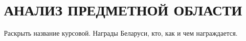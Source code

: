\section[Анализ предметной области]{АНАЛИЗ ПРЕДМЕТНОЙ ОБЛАСТИ}

Раскрыть название курсовой. Награды Беларуси, кто, как и чем награждается.







